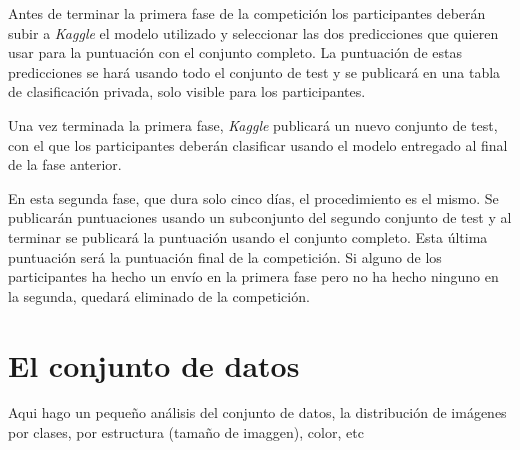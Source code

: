 Antes de terminar la primera fase de la competición los participantes deberán subir a \textit{Kaggle} el modelo utilizado y seleccionar las dos predicciones que quieren usar para la puntuación con el conjunto completo. La puntuación de estas predicciones se hará usando todo el conjunto de test y se publicará en una tabla de clasificación privada, solo visible para los participantes. 

Una vez terminada la primera fase, \textit{Kaggle} publicará un nuevo conjunto de test, con el que los participantes deberán clasificar usando el modelo entregado al final de la fase anterior.

En esta segunda fase, que dura solo cinco días, el procedimiento es el mismo. Se publicarán puntuaciones usando un subconjunto del segundo conjunto de test y al terminar se publicará la puntuación usando el conjunto completo. Esta última puntuación será la puntuación final de la competición. Si alguno de los participantes ha hecho un envío en la primera fase pero no ha hecho ninguno en la segunda, quedará eliminado de la competición.

\section{El conjunto de datos}

Aqui hago un pequeño análisis del conjunto de datos, la distribución de imágenes por clases, por estructura (tamaño de imaggen), color, etc

